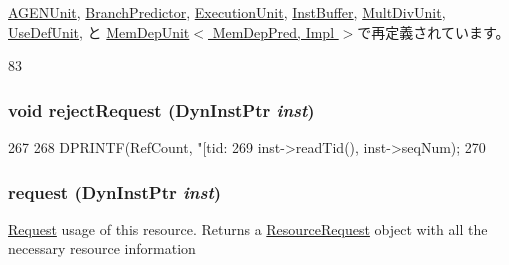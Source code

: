 \hyperlink{classAGENUnit_a4dc637449366fcdfc4e764cdf12d9b11}{AGENUnit}, \hyperlink{classBranchPredictor_a4dc637449366fcdfc4e764cdf12d9b11}{BranchPredictor}, \hyperlink{classExecutionUnit_a4dc637449366fcdfc4e764cdf12d9b11}{ExecutionUnit}, \hyperlink{classInstBuffer_a4dc637449366fcdfc4e764cdf12d9b11}{InstBuffer}, \hyperlink{classMultDivUnit_a4dc637449366fcdfc4e764cdf12d9b11}{MultDivUnit}, \hyperlink{classUseDefUnit_a4dc637449366fcdfc4e764cdf12d9b11}{UseDefUnit}, と \hyperlink{classMemDepUnit_a4dc637449366fcdfc4e764cdf12d9b11}{MemDepUnit$<$ MemDepPred, Impl $>$}で再定義されています。


\begin{DoxyCode}
83 { }
\end{DoxyCode}
\hypertarget{classResource_a00d6f4600ca80ac12352a9c0d3922857}{
\subsubsection[{rejectRequest}]{\setlength{\rightskip}{0pt plus 5cm}void rejectRequest ({\bf DynInstPtr} {\em inst})}}
\label{classResource_a00d6f4600ca80ac12352a9c0d3922857}



\begin{DoxyCode}
267 {
268     DPRINTF(RefCount, "[tid:%
269             inst->readTid(), inst->seqNum);
270 }
\end{DoxyCode}
\hypertarget{classResource_acd38b2c94092af431807b57f7b7cef6c}{
\subsubsection[{request}]{ request ({\bf DynInstPtr} {\em inst})}}
\label{classResource_acd38b2c94092af431807b57f7b7cef6c}
\hyperlink{classRequest}{Request} usage of this resource. Returns a \hyperlink{classResourceRequest}{ResourceRequest} object with all the necessary resource information 


